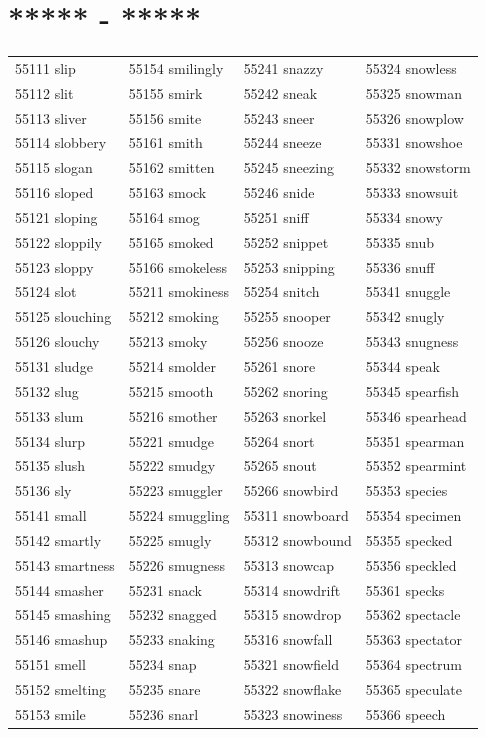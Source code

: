 \documentclass[10pt, oneside]{book}
\begin{document}
\begin{table}[h]
	\centering
	\section*{***** - *****}
	\begin{tabular}{l l l l}
55111 slip &55154 smilingly &55241 snazzy &55324 snowless\\
55112 slit &55155 smirk &55242 sneak &55325 snowman\\
55113 sliver &55156 smite &55243 sneer &55326 snowplow\\
55114 slobbery &55161 smith &55244 sneeze &55331 snowshoe\\
55115 slogan &55162 smitten &55245 sneezing &55332 snowstorm\\
55116 sloped &55163 smock &55246 snide &55333 snowsuit\\
55121 sloping &55164 smog &55251 sniff &55334 snowy\\
55122 sloppily &55165 smoked &55252 snippet &55335 snub\\
55123 sloppy &55166 smokeless &55253 snipping &55336 snuff\\
55124 slot &55211 smokiness &55254 snitch &55341 snuggle\\
55125 slouching &55212 smoking &55255 snooper &55342 snugly\\
55126 slouchy &55213 smoky &55256 snooze &55343 snugness\\
55131 sludge &55214 smolder &55261 snore &55344 speak\\
55132 slug &55215 smooth &55262 snoring &55345 spearfish\\
55133 slum &55216 smother &55263 snorkel &55346 spearhead\\
55134 slurp &55221 smudge &55264 snort &55351 spearman\\
55135 slush &55222 smudgy &55265 snout &55352 spearmint\\
55136 sly &55223 smuggler &55266 snowbird &55353 species\\
55141 small &55224 smuggling &55311 snowboard &55354 specimen\\
55142 smartly &55225 smugly &55312 snowbound &55355 specked\\
55143 smartness &55226 smugness &55313 snowcap &55356 speckled\\
55144 smasher &55231 snack &55314 snowdrift &55361 specks\\
55145 smashing &55232 snagged &55315 snowdrop &55362 spectacle\\
55146 smashup &55233 snaking &55316 snowfall &55363 spectator\\
55151 smell &55234 snap &55321 snowfield &55364 spectrum\\
55152 smelting &55235 snare &55322 snowflake &55365 speculate\\
55153 smile &55236 snarl &55323 snowiness &55366 speech\\
	\end{tabular}
 \end{table}
\end{document}
